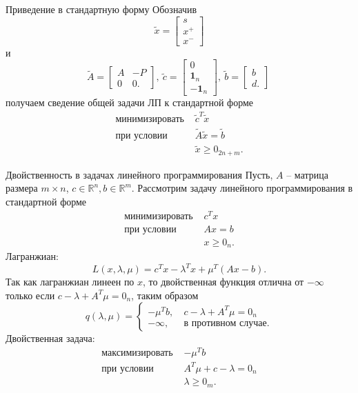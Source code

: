 \documentclass[10pt]{beamer}
\begin{document}
\begin{frame}{Приведение в стандартную форму}
Обозначив
$$
\tilde{x}=\left[\begin{array}{ll}
s \\ x^+ \\ x^-
\end{array}\right]
$$
и
$$
\tilde{A}=\left[\begin{array}{ll}
A & -P \\
0 & 0.
\end{array}\right],~
\tilde{c}=\left[\begin{array}{ll}
0 \\
\mathbf{1}_n \\
-\mathbf{1}_n
\end{array}\right],~
\tilde{b}=\left[\begin{array}{ll}
b \\
d.
\end{array}\right]~
$$
получаем сведение общей задачи ЛП к стандартной форме
$$
\begin{array}{ll}
\mbox{минимизировать } & \tilde{c}^T\tilde{x} \\ 
\mbox{при условии }    & \tilde{A}\tilde{x}=\tilde{b}\\
& \tilde{x}\geq 0_{2n+m}.
\end{array}
$$
\end{frame}


\begin{frame}{Двойственность в задачах линейного программирования}
Пусть, $A$ -- матрица размера $m\times n$, $c\in \mathbb{R}^n, b\in \mathbb{R}^m$. Рассмотрим задачу линейного программирования в стандартной форме 
$$
\begin{array}{ll}
\mbox{минимизировать } & c^Tx\\
\mbox{при условии }    &  Ax= b\\
					   & x\geq 0_n.
\end{array}
$$
Лагранжиан:
$$
L(x, \lambda, \mu)= c^Tx-\lambda^Tx+\mu^T(Ax-b).
$$
Так как лагранжиан линеен по $x$, то двойственная функция отлична от $-\infty$ только если $c-\lambda+A^T\mu=0_n$, таким образом
$$
q(\lambda, \mu)=\left\{
\begin{array}{ll}
-\mu^Tb, &~c-\lambda+A^T\mu=0_n\\
-\infty, &~\mbox{в противном случае}.
\end{array}\right.
$$
Двойственная задача:
$$
\begin{array}{ll}
\mbox{максимизировать } & -\mu^Tb \\
\mbox{при условии }     & A^T\mu+c-\lambda=0_n \\
 & \lambda\geq 0_m. 
\end{array}
$$
\end{frame}
\end{document}
